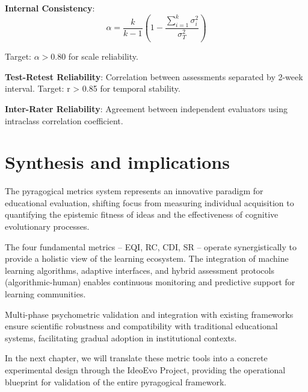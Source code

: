 \textbf{Internal Consistency}:
\begin{equation}
	\alpha = \frac{k}{k-1}\left(1 - \frac{\sum_{i=1}^{k} \sigma_i^2}{\sigma_T^2}\right)
	\label{eq:cronbach-alpha}
\end{equation}

Target: $\alpha > 0.80$ for scale reliability.

\textbf{Test-Retest Reliability}:
Correlation between assessments separated by 2-week interval.
Target: r > 0.85 for temporal stability.

\textbf{Inter-Rater Reliability}:
Agreement between independent evaluators using intraclass correlation coefficient.

\section{Synthesis and implications}
\raggedbottom

\setlength{\parskip}{0.1em} %
\setlength{\parindent}{0pt} %
The pyragogical metrics system represents an innovative paradigm for educational evaluation, shifting focus from measuring individual acquisition to quantifying the epistemic fitness of ideas and the effectiveness of cognitive evolutionary processes.

The four fundamental metrics -- EQI, RC, CDI, SR -- operate synergistically to provide a holistic view of the learning ecosystem. The integration of machine learning algorithms, adaptive interfaces, and hybrid assessment protocols (algorithmic-human) enables continuous monitoring and predictive support for learning communities.

Multi-phase psychometric validation and integration with existing frameworks ensure scientific robustness and compatibility with traditional educational systems, facilitating gradual adoption in institutional contexts.

In the next chapter, we will translate these metric tools into a concrete experimental design through the IdeoEvo Project, providing the operational blueprint for validation of the entire pyragogical framework.